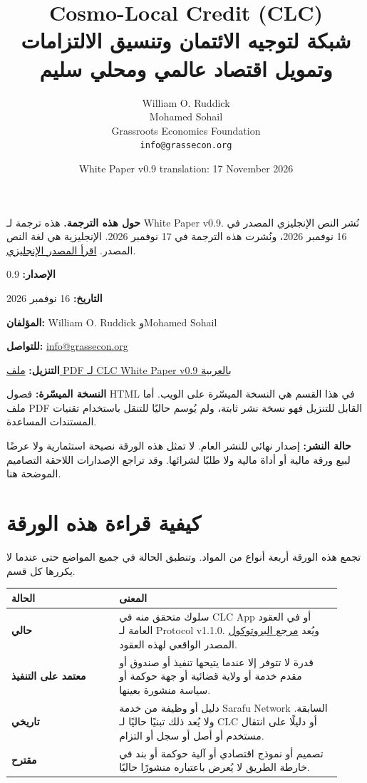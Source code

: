 \documentclass[11pt]{article}
\title{\foreignlanguage{english}{Cosmo-Local Credit (CLC)}\\شبكة لتوجيه الائتمان وتنسيق الالتزامات وتمويل اقتصاد عالمي ومحلي سليم}
\author{William O. Ruddick \\ Mohamed Sohail \\ Grassroots Economics Foundation \\ \texttt{info@grassecon.org}}
\date{White Paper v0.9 translation: 17 November 2026}
\begin{document}
\maketitle
\tableofcontents
\newpage
\sloppy
\RaggedLeft

\textbf{حول هذه الترجمة.} هذه ترجمة لـ White Paper v0.9. نُشر النص الإنجليزي المصدر في 16 نوفمبر 2026، ونُشرت هذه الترجمة في 17 نوفمبر 2026. الإنجليزية هي لغة النص المصدر. \href{https://docs.cosmolocal.credit/white-paper}{اقرأ المصدر الإنجليزي}.

\textbf{الإصدار:} 0.9

\textbf{التاريخ:} 16 نوفمبر 2026

\textbf{المؤلفان:} William O. Ruddick وMohamed Sohail

\textbf{للتواصل:} \href{mailto:info@grassecon.org}{info@grassecon.org}

\textbf{التنزيل:} \href{https://docs.cosmolocal.credit/white-paper/Cosmo-Local-Credit-CLC-White-Paper-v9-ar.pdf}{ملف PDF لـ CLC White Paper v0.9 بالعربية}

\textbf{النسخة الميسّرة:} فصول HTML في هذا القسم هي النسخة الميسّرة على الويب. أما ملف PDF القابل للتنزيل فهو نسخة نشر ثابتة، ولم يُوسم حاليًا للتنقل باستخدام تقنيات المستندات المساعدة.

\textbf{حالة النشر:} إصدار نهائي للنشر العام. لا تمثل هذه الورقة نصيحة استثمارية ولا عرضًا لبيع ورقة مالية أو أداة مالية ولا طلبًا لشرائها. وقد تراجع الإصدارات اللاحقة التصاميم الموضحة هنا.

\section*{كيفية قراءة هذه الورقة}

تجمع هذه الورقة أربعة أنواع من المواد. وتنطبق الحالة في جميع المواضع حتى عندما لا يكررها كل قسم.

\begin{longtable}{P{0.30\linewidth} P{0.62\linewidth}}
\toprule
الحالة & المعنى \\
\midrule
\endhead
\textbf{حالي} & سلوك متحقق منه في CLC App أو في العقود العامة لـ Protocol v1.1.0. ويُعد \href{https://docs.cosmolocal.credit/ar/protocol/overview}{مرجع البروتوكول} المصدر الواقعي لهذه العقود. \\
\textbf{معتمد على التنفيذ} & قدرة لا تتوفر إلا عندما يتيحها تنفيذ أو صندوق أو مقدم خدمة أو ولاية قضائية أو جهة حوكمة أو سياسة منشورة بعينها. \\
\textbf{تاريخي} & دليل أو وظيفة من خدمة Sarafu Network السابقة. ولا يُعد ذلك تبنيًا حاليًا لـ CLC أو دليلًا على انتقال مستخدم أو أصل أو سجل أو التزام. \\
\textbf{مقترح} & تصميم أو نموذج اقتصادي أو آلية حوكمة أو بند في خارطة الطريق لا يُعرض باعتباره منشورًا حاليًا. \\
\bottomrule
\end{longtable}
\end{document}
